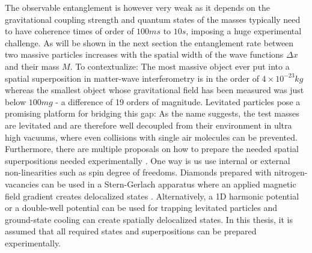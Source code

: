 The observable entanglement is however very weak as it depends on the gravitational coupling strength and quantum states of the masses typically need to have coherence times of order of $100\si{ms}$ to $10\si{s}$, imposing a huge experimental challenge.
As will be shown in the next section the entanglement rate between two massive particles increases with the spatial width of the wave functions $\Delta x$ and their mass $M$.
To contextualize: The most massive object ever put into a spatial superposition in matter-wave interferometry is in the order of $4\times 10^{-23}\si{kg}$ \cite{Fein_2019} whereas the smallest object whose gravitational field has been measured was just below $100\si{mg}$ \cite{Westphal_2021} - a difference of 19 orders of magnitude.
Levitated particles pose a promising platform for bridging this gap: As the name suggests, the test masses are levitated and are therefore well decoupled from their environment in ultra high vacuums, where even collisions with single air molecules can be prevented.
Furthermore, there are multiple proposals on how to prepare the needed spatial superpositions needed experimentally \cite{Bose_2017,Krisnanda_2020,Marletto_2017}.
One way is us use internal or external non-linearities such as spin degree of freedoms.
Diamonds prepared with nitrogen-vacancies can be used in a Stern-Gerlach apparatus where an applied magnetic field gradient creates delocalized states \cite{Bose_2017}.
Alternatively, a 1D harmonic potential \cite{Krisnanda_2020} or a double-well potential can be used for trapping levitated particles and ground-state cooling can create spatially delocalized states.
In this thesis, it is assumed that all required states and superpositions can be prepared experimentally.

